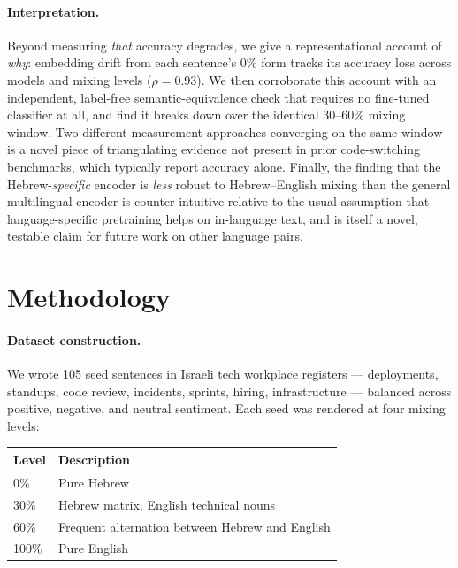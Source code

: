 \documentclass{article}
\begin{document}
\paragraph{Interpretation.} Beyond measuring \emph{that} accuracy degrades,
we give a representational account of \emph{why}: embedding drift from each
sentence's 0\% form tracks its accuracy loss across models and mixing levels
($\rho=0.93$). We then corroborate this account with an independent,
label-free semantic-equivalence check that requires no fine-tuned classifier
at all, and find it breaks down over the identical 30--60\% mixing window.
Two different measurement approaches converging on the same window is a
novel piece of triangulating evidence not present in prior code-switching
benchmarks, which typically report accuracy alone. Finally, the finding that
the Hebrew-\emph{specific} encoder is \emph{less} robust to Hebrew--English
mixing than the general multilingual encoder is counter-intuitive relative to
the usual assumption that language-specific pretraining helps on
in-language text, and is itself a novel, testable claim for future work on
other language pairs.

\section{Methodology}

\paragraph{Dataset construction.} We wrote 105 seed sentences in Israeli tech
workplace registers --- deployments, standups, code review, incidents,
sprints, hiring, infrastructure --- balanced across positive, negative, and
neutral sentiment. Each seed was rendered at four mixing levels:

\begin{center}
\small
\begin{tabular}{ll}
\toprule
\textbf{Level} & \textbf{Description} \\
\midrule
0\%   & Pure Hebrew \\
30\%  & Hebrew matrix, English technical nouns \\
60\%  & Frequent alternation between Hebrew and English \\
100\% & Pure English \\
\bottomrule
\end{tabular}
\end{center}
\end{document}
